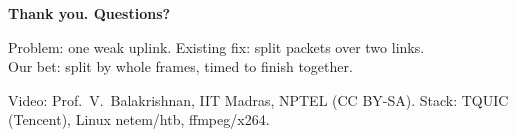 \documentclass[aspectratio=169,11pt]{beamer}
\begin{document}
{
\begin{frame}[plain]
  \vfill
  {\color{paper}\Huge\bfseries Thank you. Questions?\par}\bigskip
  {\color{mist}\large Problem: one weak uplink. Existing fix: split packets over two links.\\ Our bet: split by whole frames, timed to finish together.\par}
  \vfill
  {\color{mist}\scriptsize Video: Prof.\ V.\ Balakrishnan, IIT Madras, NPTEL (CC BY-SA). Stack: TQUIC (Tencent), Linux netem/htb, ffmpeg/x264.}
\end{frame}}
\end{document}
